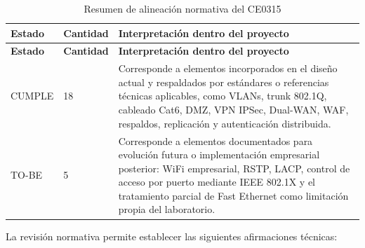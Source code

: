 \documentclass[11pt, a4paper, oneside]{report}
\begin{document}
\renewcommand{\arraystretch}{1.3}
\footnotesize
{}

\begin{xltabular}{\textwidth}{@{}|L{3.2cm}|N{2.3cm}|X|@{}}
\caption{Resumen de alineación normativa del CE0315}
\label{tab:resumen_alineacion_normativa_ce0315} \\

\parbox[c][1.1cm][c]{\linewidth}{\centering\color{white}\bfseries\small Estado} &
\parbox[c][1.1cm][c]{\linewidth}{\centering\color{white}\bfseries\small Cantidad} &
\parbox[c][1.1cm][c]{\linewidth}{\centering\color{white}\bfseries\small Interpretación dentro del proyecto} \\ \hline
\endfirsthead

\parbox[c][1.1cm][c]{\linewidth}{\centering\color{white}\bfseries\small Estado} &
\parbox[c][1.1cm][c]{\linewidth}{\centering\color{white}\bfseries\small Cantidad} &
\parbox[c][1.1cm][c]{\linewidth}{\centering\color{white}\bfseries\small Interpretación dentro del proyecto} \\ \hline
\endhead

\hline
\endfoot

{\small CUMPLE} &
{\small 18} &
{\small Corresponde a elementos incorporados en el diseño actual y respaldados por estándares o referencias técnicas aplicables, como VLANs, trunk 802.1Q, cableado Cat6, DMZ, VPN IPSec, Dual-WAN, WAF, respaldos, replicación y autenticación distribuida.} \\ \hline

{\small TO-BE} &
{\small 5} &
{\small Corresponde a elementos documentados para evolución futura o implementación empresarial posterior: WiFi empresarial, RSTP, LACP, control de acceso por puerto mediante IEEE 802.1X y el tratamiento parcial de Fast Ethernet como limitación propia del laboratorio.} \\ \hline

\end{xltabular}

\normalsize

La revisión normativa permite establecer las siguientes afirmaciones técnicas:
\end{document}

